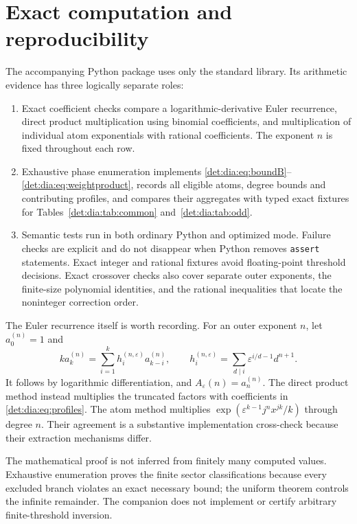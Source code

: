 \documentclass[11pt,letterpaper]{article}
\numberwithin{equation}{section}
\theoremstyle{definition}\newtheorem{definition}[theorem]{Definition}
\theoremstyle{remark}\newtheorem{remark}[theorem]{Remark}
\newcommand{\eps}{\varepsilon}
\begin{document}
\section{Exact computation and reproducibility}\label{det:dia:sec:companion}
The accompanying Python package uses only the standard library. Its
arithmetic evidence has three logically separate roles:
\begin{enumerate}
\item Exact coefficient checks compare a logarithmic-derivative Euler
recurrence, direct product multiplication using binomial coefficients,
and multiplication of individual atom exponentials with rational
coefficients. The exponent $n$ is fixed throughout each row.
\item Exhaustive phase enumeration implements
\eqref{det:dia:eq:boundB}--\eqref{det:dia:eq:weightproduct}, records all eligible atoms,
degree bounds and contributing profiles, and compares their aggregates
with typed exact fixtures for Tables~\ref{det:dia:tab:common} and~\ref{det:dia:tab:odd}.
\item Semantic tests run in both ordinary Python and optimized mode.
Failure checks are explicit and do not disappear when Python removes
\texttt{assert} statements. Exact integer and rational fixtures avoid
floating-point threshold decisions. Exact crossover checks also cover
separate outer exponents, the finite-size polynomial identities, and
the rational inequalities that locate the noninteger correction order.
\end{enumerate}
The Euler recurrence itself is worth recording. For an outer exponent
$n$, let $a^{(n)}_0=1$ and
\begin{equation}\label{det:dia:eq:recurrence}
 k a^{(n)}_k=\sum_{i=1}^k h_i^{(n,\eps)}a^{(n)}_{k-i},\qquad
 h_i^{(n,\eps)}=\sum_{d\mid i}\eps^{i/d-1}d^{n+1}.
\end{equation}
It follows by logarithmic differentiation, and $A_\eps(n)=a^{(n)}_n$.
The direct product method instead multiplies the truncated factors with
coefficients in \eqref{det:dia:eq:profiles}. The atom method multiplies
$\exp(\eps^{k-1}j^n x^{jk}/k)$ through degree $n$. Their agreement
is a substantive implementation cross-check because their extraction
mechanisms differ.

The mathematical proof is not inferred from finitely many computed
values. Exhaustive enumeration proves the finite sector classifications
because every excluded branch violates an exact necessary bound; the
uniform theorem controls the infinite remainder. The companion does not
implement or certify arbitrary finite-threshold inversion.
\end{document}
